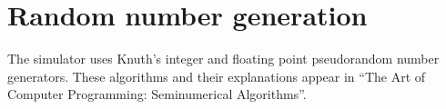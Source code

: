 \documentclass[11pt]{article}
\begin{document}
\appendix
\section{Random number generation}

The simulator uses Knuth's integer and floating point pseudorandom
number generators.  These algorithms and their explanations appear in
``The Art of Computer Programming: Seminumerical Algorithms''.
\end{document}
